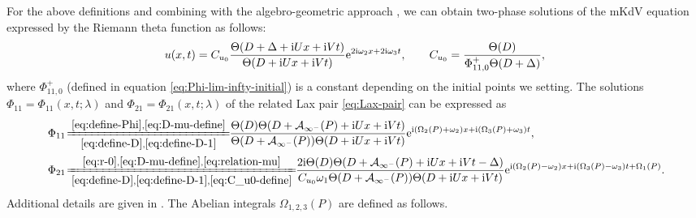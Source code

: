 \documentclass[11pt,reqno]{amsart}
\newcommand{\ii}{\mathrm{i}}
\newcommand{\ee}{\mathrm{e}}
\numberwithin{equation}{section}
\begin{document}
For the above definitions and combining with the algebro-geometric approach \cite{BelokolosBEI-94,FritzH-2003-Algebro-Geometric}, we can obtain two-phase solutions of the mKdV equation expressed by the Riemann theta function as follows:
\begin{equation}\label{eq:q1-q0}
	u(x,t)= C_{u_0}\frac{\Theta(D+\Delta+\ii Ux+\ii V t)}{\Theta(D+\ii Ux+\ii V t)}\ee^{2\ii \omega_2 x+2\ii \omega_3  t},\qquad C_{u_0}=\frac{\Theta(D)}{\Phi_{11,0}^{+}\Theta(D+\Delta)},\\
\end{equation}
where $\Phi_{11,0}^{+}$ (defined in equation \eqref{eq:Phi-lim-infty-initial}) is a constant depending on the initial points we setting. 
The solutions $\Phi_{11}=\Phi_{11}(x,t;\lambda)$ and $\Phi_{21}=\Phi_{21}(x,t;\lambda)$ of the related Lax pair \eqref{eq:Lax-pair} can be expressed as 
\begin{equation}\label{eq:Phi-expression}
	\begin{split}
		\!\!\!
		\Phi_{11}
		&\!
		\xlongequal[\eqref{eq:define-D},\eqref{eq:define-D-1}]{\eqref{eq:define-Phi},\eqref{eq:D-mu-define}}\!\! \frac{\Theta(D)\Theta(D+\mathcal{A}_{\infty^{-}}(P)+\ii Ux+\ii Vt)}{\Theta(D+\mathcal{A}_{\infty^{-}}(P))\Theta(D+\ii Ux+\ii Vt)}
		\ee^{\ii \left(\Omega_2(P) + \omega_2 \right)x+\ii\left(\Omega_3(P) + \omega_3 \right)t}
		,\\
		\!\!\!
		\Phi_{21}
		&\!
		\xlongequal[ \eqref{eq:define-D},\eqref{eq:define-D-1},\eqref{eq:C_u0-define}]{\eqref{eq:r-0},\eqref{eq:D-mu-define},\eqref{eq:relation-mu}}  \!\!
		\frac{2\ii\Theta(D)\Theta(D+\mathcal{A}_{\infty^{-}}(P)+\ii Ux+\ii Vt-\Delta)}
		{C_{u_0}\omega_1 \Theta(D+\mathcal{A}_{\infty^{-}}(P))\Theta(D+\ii Ux+\ii Vt)}
		\ee^{\ii \left(\Omega_2(P)-\omega_2 \right)x+\ii\left(\Omega_3(P) - \omega_3 \right)t+\Omega_1(P)}.\!\!\!\!
	\end{split}
\end{equation}
Additional details are given in .
The Abelian integrals $\Omega_{1,2,3}(P)$ are defined as follows.
\end{document}
